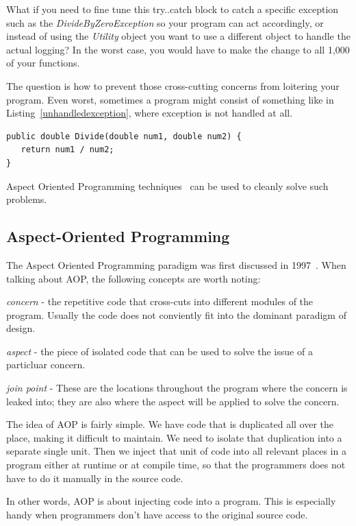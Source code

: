 What if you need to fine tune this try..catch block to catch a specific exception such as the {\em DivideByZeroException} so your program can act accordingly, or instead of using the {\em Utility} object you want to use a different object to handle the actual logging? In the worst case, you would have to make the change to all 1,000 of your functions.

The question is how to prevent those cross-cutting concerns from loitering your program. Even worst, sometimes a program might consist of something like in Listing~\ref{unhandledexception}, where exception is not handled at all.

\begin{lstlisting}[caption={Unhandle exception}, label=unhandledexception]
public double Divide(double num1, double num2) {
   return num1 / num2;
}
\end{lstlisting}

Aspect Oriented Programming techniques~\cite{aop} can be used to cleanly solve such problems.

\subsection{Aspect-Oriented Programming}
The Aspect Oriented Programming paradigm was first discussed in 1997~\cite{aop}. When talking about AOP, the following concepts are worth noting:

{\em concern} - the repetitive code that cross-cuts into different modules of the program. Usually the code does not conviently fit into the dominant paradigm of design.

{\em aspect} - the piece of isolated code that can be used to solve the issue of a particluar concern.

{\em join point} - These are the locations throughout the program where the concern is leaked into; they are also where the aspect will be applied to solve the concern.

The idea of AOP is fairly simple. We have code that is duplicated all over the place, making it difficult to maintain. We need to isolate that duplication into a separate single unit. Then we inject that unit of code into all relevant places in a program either at runtime or at compile time, so that the programmers does not have to do it manually in the source code.

In other words, AOP is about injecting code into a program. This is especially handy when programmers don't have access to the original source code.

